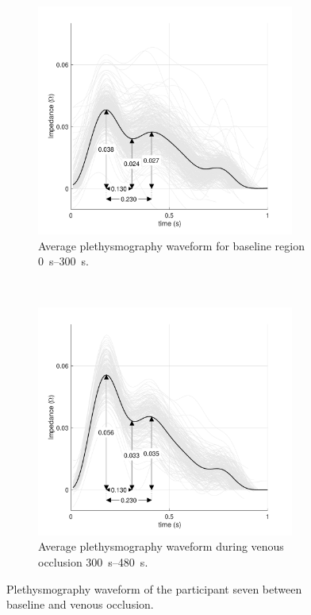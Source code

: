 \begin{figure}[h]
	\centering
	\begin{subfigure}[t]{0.5\textwidth}
		\centering
		\includegraphics[height=7.6cm]{figure6a}
		\caption{Average plethysmography waveform for baseline region \SIrange{0}{300}{\second}.}
		\label{fig:iPG_venous_baseline}
	\end{subfigure}%
	~ 
	\begin{subfigure}[t]{0.5\textwidth}
		\centering
		\includegraphics[height=7.6cm]{figure6b}
		\caption{Average plethysmography waveform during venous occlusion \SIrange{300}{480}{\second}. }
		\label{fig:iPG_venous_occlusion}
	\end{subfigure}
	\caption{Plethysmography waveform of the participant seven between baseline and venous occlusion. }
	\label{fig:iPG_venous}
\end{figure}

